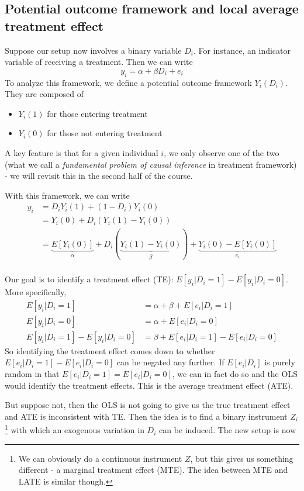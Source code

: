 \documentclass[12pt]{article}
\theoremstyle{definition}
\theoremstyle{property}
\theoremstyle{assumption}
\theoremstyle{example}
\theoremstyle{comment}
\begin{document}
\subsection{Potential outcome framework and local average treatment effect}
Suppose our setup now involves a binary variable $D_i$. For instance, an indicator variable of receiving a treatment. Then we can write
\[
y_i = \alpha+\beta D_i +e_i
\]
To analyze this framework, we define a potential outcome framework $Y_i(D_i)$. They are composed of
\begin{itemize}
\item $Y_i(1)$ for those entering treatment
\item $Y_i(0)$ for those not entering treatment
\end{itemize}
A key feature is that for a given individual $i$, we only observe one of the two (what we call a \textit{fundamental problem of causal inference} in treatment framework) - we will revisit this in the second half of the course.
\par
 With this framework, we can write
\[
\begin{aligned}
y_i& = D_iY_i(1)+(1-D_i)Y_i(0)\\
&=Y_i(0)+D_i(Y_i(1)-Y_i(0))\\
&=\underbrace{E[Y_i(0)]}_{\alpha}+D_i(\underbrace{Y_i(1)-Y_i(0)}_{\beta})+\underbrace{Y_i(0)-E[Y_i(0)]}_{e_i}\\
\end{aligned}
\]
\par
Our goal is to identify a treatment effect (TE): $E[y_i|D_i=1]-E[y_i|D_i=0]$. More specifically, 
\[
\begin{aligned}
E[y_i|D_i=1]&=\alpha+\beta +E[e_i|D_i=1]\\
E[y_i|D_i=0]&=\alpha+E[e_i|D_i=0]\\
E[y_i|D_i=1]-E[y_i|D_i=0]&=\beta + E[e_i|D_i=1]- E[e_i|D_i=0]
\end{aligned}
\]
So identifying the treatment effect comes down to whether $E[e_i|D_i=1]- E[e_i|D_i=0]$ can be negated any further. If $E[e_i|D_i]$ is purely random in that $E[e_i|D_i=1] = E[e_i|D_i=0]$, we can in fact do so and the OLS would identify the treatment effects. This is the average treatment effect (ATE). 
\par
But suppose not, then the OLS is not going to give us the true treatment effect and ATE is inconsistent with TE. Then the idea is to find a binary instrument $Z_i$\footnote{We can obviously do a continuous instrument $Z$, but this gives us something different - a marginal treatment effect (MTE). The idea between MTE and LATE is similar though.} with which an exogenous variation in $D_i$ can be induced. The new setup is now
\end{document}
